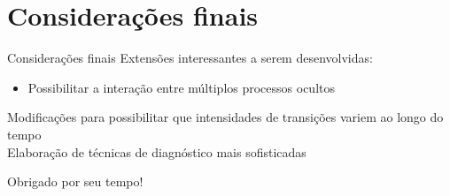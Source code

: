 \documentclass[ignorenonframetext,]{beamer}
\begin{document}
\section{Considerações finais}\label{consideracoes-finais}

\begin{frame}

\begin{block}{Considerações finais}
 \pause
 Extensões interessantes a serem desenvolvidas:
 \begin{itemize}
  \item Possibilitar a interação entre múltiplos processos ocultos
 \end{itemize}
 \pause
 Modificações para possibilitar que intensidades de transições variem ao
 longo do tempo \\
 \vspace{.25cm}
 \pause
 Elaboração de técnicas de diagnóstico mais sofisticadas
\end{block}

\end{frame}

\begin{frame}

\LARGE \centering Obrigado por seu tempo!

\end{frame}
\end{document}
